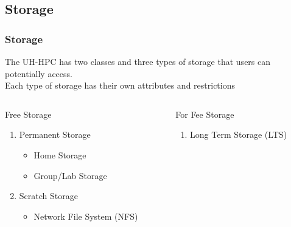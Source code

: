 \subsection{Storage}
\begin{frame}
  \frametitle{Storage}
  The UH-HPC has two classes and three types of storage that users can potentially access.\\Each type of storage has their own attributes and restrictions
	\begin{columns}
		\begin{column}{0.46\textwidth}
		\begin{block}{Free Storage}
			\begin{enumerate}
			\item Permanent Storage
				\begin{itemize}
				\item Home Storage
				\item Group/Lab Storage
				\end{itemize}
			\item Scratch Storage
				\begin{itemize}
				\item Network File System (NFS)
				\end{itemize}
		\end{enumerate}
		\end{block}
		\end{column}
		\begin{column}{0.46\textwidth}
		\begin{block}{For Fee Storage}
			\begin{enumerate}
				\item Long Term Storage (LTS)
		\end{enumerate}
		\end{block}
		\end{column}
	\end{columns}      
\end{frame}

